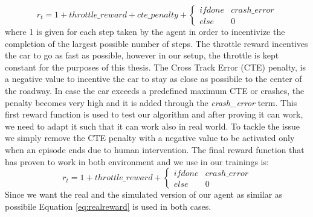 \begin{equation}
  \label{eq:stdreward}
    r_t = 1 + throttle\_reward + cte\_penalty + \left\{\begin{matrix}
    if done & crash\_error \\ 
    else & 0  
    \end{matrix}\right.
\end{equation}
where 1 is given for each step taken by the agent in order to incentivize the completion of the largest possible number of steps. The throttle reward incentives the car to go as fast as possible, however in our setup, the throttle is kept constant for the purposes of this thesis. The Cross Track Error (CTE) penalty, is a negative value to incentive the car to stay as close as possibile to the center of the roadway. In case the car exceeds a predefined maximum CTE or crashes, the penalty becomes very high and it is added through the \textit{crash\_error} term. 
This first reward function is used to test our algorithm and after proving it can work, we need to adapt it such that it can work also in real world. To tackle the issue we simply remove the CTE penalty with a negative value to be activated only when an episode ends due to human intervention. The final reward function that has proven to work in both environment and we use in our trainings is:
\begin{equation}
  \label{eq:realreward}
    r_t = 1 + throttle\_reward + \left\{\begin{matrix}
    if done & crash\_error \\ 
    else & 0  
    \end{matrix}\right.
\end{equation}
Since we want the real and the simulated version of our agent as similar as possibile Equation \ref{eq:realreward} is used in both cases.

